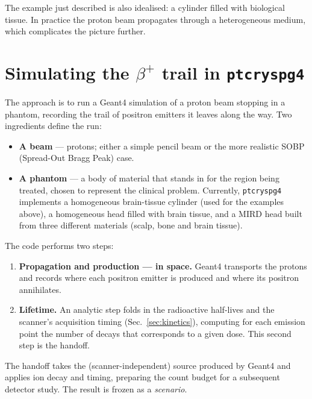 \documentclass[11pt]{article}
\newcommand{\bplus}{\beta^{+}}
\begin{document}
The example just described is also idealised: a cylinder filled with biological tissue. In practice the proton beam propagates through a heterogeneous medium, which complicates the picture further.


\section{Simulating the \texorpdfstring{$\bplus$}{beta+} trail in \texttt{ptcryspg4}}
\label{sec:pipeline}

The approach is to run a Geant4 simulation of a proton beam stopping in a phantom, recording the trail of positron emitters it leaves along the way. Two ingredients define
the run:

\begin{itemize}[nosep]
\item \textbf{A beam} --- protons; either a simple pencil beam or the more realistic SOBP (Spread-Out Bragg Peak) case.
\item \textbf{A phantom} --- a body of material that stands in for the region being
treated, chosen to represent the clinical problem. Currently, \texttt{ptcryspg4} implements a homogeneous brain-tissue cylinder (used for the examples above), a homogeneous head filled with brain tissue, and a MIRD head built from three different materials (scalp, bone and brain tissue).
\end{itemize}

The code performs two steps:
\begin{enumerate}[nosep]
\item \textbf{Propagation and production --- in space.} Geant4 transports the protons
and records where each positron emitter is produced and where its positron
annihilates.
\item \textbf{Lifetime.} An analytic step folds in the radioactive
half-lives and the scanner's acquisition timing (Sec.~\ref{sec:kinetics}), computing for each emission point the number of decays that corresponds to a given dose. This second step is the handoff.
\end{enumerate}

The handoff takes the (scanner-independent) source produced by
Geant4 and applies ion decay and timing, preparing the count budget for a subsequent detector study.  The result is frozen as a {\em scenario}.
\end{document}
